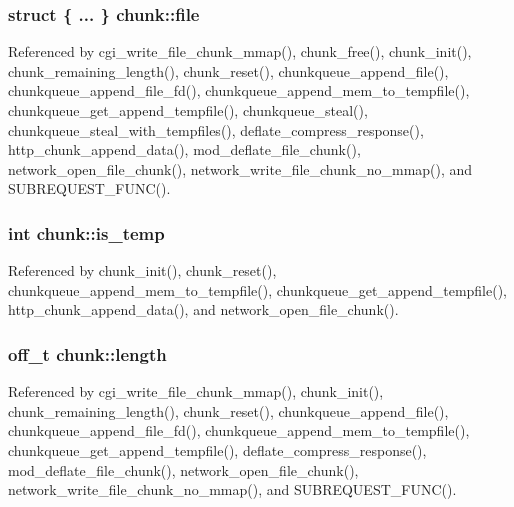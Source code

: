 \hypertarget{structchunk_a377cbfc776a7513a056f49401d77234f}{
\subsubsection[{file}]{\setlength{\rightskip}{0pt plus 5cm}struct \{ ... \}   chunk\-::file}}\label{structchunk_a377cbfc776a7513a056f49401d77234f}


Referenced by cgi\-\_\-write\-\_\-file\-\_\-chunk\-\_\-mmap(), chunk\-\_\-free(), chunk\-\_\-init(), chunk\-\_\-remaining\-\_\-length(), chunk\-\_\-reset(), chunkqueue\-\_\-append\-\_\-file(), chunkqueue\-\_\-append\-\_\-file\-\_\-fd(), chunkqueue\-\_\-append\-\_\-mem\-\_\-to\-\_\-tempfile(), chunkqueue\-\_\-get\-\_\-append\-\_\-tempfile(), chunkqueue\-\_\-steal(), chunkqueue\-\_\-steal\-\_\-with\-\_\-tempfiles(), deflate\-\_\-compress\-\_\-response(), http\-\_\-chunk\-\_\-append\-\_\-data(), mod\-\_\-deflate\-\_\-file\-\_\-chunk(), network\-\_\-open\-\_\-file\-\_\-chunk(), network\-\_\-write\-\_\-file\-\_\-chunk\-\_\-no\-\_\-mmap(), and S\-U\-B\-R\-E\-Q\-U\-E\-S\-T\-\_\-\-F\-U\-N\-C().

\hypertarget{structchunk_aa72c09f709bc0dae2b87dcf997632a36}{
\subsubsection[{is\-\_\-temp}]{\setlength{\rightskip}{0pt plus 5cm}int chunk\-::is\-\_\-temp}}\label{structchunk_aa72c09f709bc0dae2b87dcf997632a36}


Referenced by chunk\-\_\-init(), chunk\-\_\-reset(), chunkqueue\-\_\-append\-\_\-mem\-\_\-to\-\_\-tempfile(), chunkqueue\-\_\-get\-\_\-append\-\_\-tempfile(), http\-\_\-chunk\-\_\-append\-\_\-data(), and network\-\_\-open\-\_\-file\-\_\-chunk().

\hypertarget{structchunk_a0a2a511e083a5d1843621548e656dc91}{
\subsubsection[{length}]{\setlength{\rightskip}{0pt plus 5cm}off\-\_\-t chunk\-::length}}\label{structchunk_a0a2a511e083a5d1843621548e656dc91}


Referenced by cgi\-\_\-write\-\_\-file\-\_\-chunk\-\_\-mmap(), chunk\-\_\-init(), chunk\-\_\-remaining\-\_\-length(), chunk\-\_\-reset(), chunkqueue\-\_\-append\-\_\-file(), chunkqueue\-\_\-append\-\_\-file\-\_\-fd(), chunkqueue\-\_\-append\-\_\-mem\-\_\-to\-\_\-tempfile(), chunkqueue\-\_\-get\-\_\-append\-\_\-tempfile(), deflate\-\_\-compress\-\_\-response(), mod\-\_\-deflate\-\_\-file\-\_\-chunk(), network\-\_\-open\-\_\-file\-\_\-chunk(), network\-\_\-write\-\_\-file\-\_\-chunk\-\_\-no\-\_\-mmap(), and S\-U\-B\-R\-E\-Q\-U\-E\-S\-T\-\_\-\-F\-U\-N\-C().

